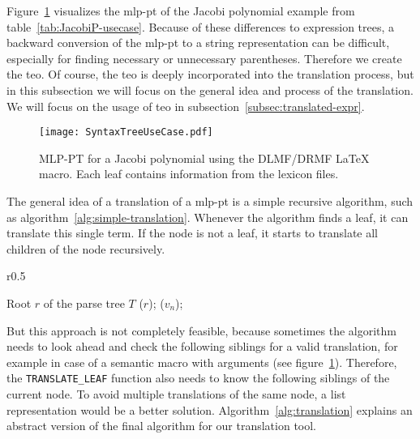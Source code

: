 Figure~\ref{fig:syntax-tree-usecase} visualizes the \gls{mlp-pt} of the Jacobi polynomial example from table~\ref{tab:JacobiP-usecase}. Because of these differences to expression trees, a backward conversion of the \gls{mlp-pt} to a string representation can be difficult, especially for finding necessary or unnecessary parentheses. Therefore we create the \gls{teo}. Of course, the \gls{teo} is deeply incorporated into the translation process, but in this subsection we will focus on the general idea and process of the translation. We will focus on the usage of \gls{teo} in subsection~\ref{subsec:translated-expr}.

\begin{figure}[ht]
	\centering
	\texttt{[image: SyntaxTreeUseCase.pdf]}
	\caption{MLP-PT for a Jacobi polynomial using the DLMF/DRMF \LaTeX{} macro. Each leaf contains information from the lexicon files.}
	\label{fig:syntax-tree-usecase}
\end{figure}

The general idea of a translation of a \gls{mlp-pt} is a simple recursive algorithm, such as algorithm~\ref{alg:simple-translation}. Whenever the algorithm finds a leaf, it can translate this single term. If the node is not a leaf, it starts to translate all children of the node recursively. 

\begin{wrapfigure}{r}{0.5\textwidth}
\vspace{-20pt}
\begin{minipage}{0.5\textwidth}
\begin{algorithm}[H]
\caption{Simple translation algorithm for the MLP-Parse Tree}\label{alg:simple-translation}
	\begin{algorithmic}[1]
	\Require Root $r$ of the parse tree $T$
		($r$);
	\Else
			($v_n$);
		\EndFor
	\EndIf
	\EndProcedure
	\end{algorithmic}
\end{algorithm}
\end{minipage}
\vspace{-14pt}
\end{wrapfigure}

But this approach is not completely feasible, because sometimes the algorithm needs to look ahead and check the following siblings for a valid translation, for example in case of a semantic macro with arguments (see figure~\ref{fig:syntax-tree-usecase}). Therefore, the {\footnotesize \verb|TRANSLATE_LEAF|} function also needs to know the following siblings of the current node. To avoid multiple translations of the same node, a list representation would be a better solution. Algorithm~\ref{alg:translation} explains an abstract version of the final algorithm for our translation tool. 


